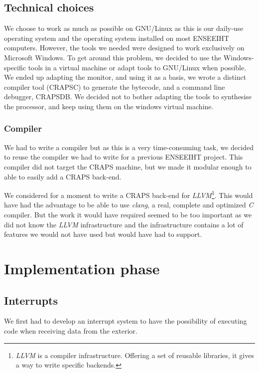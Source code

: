 \documentclass[openany, a4paper]{book}
\begin{document}
    \section{Technical choices}
      We choose to work as much as possible on GNU/Linux as this is our
      daily-use operating system and the operating system installed on most
      ENSEEIHT computers.
      However, the tools we needed were designed to work exclusively on
      Microsoft Windows. To get around this problem, we decided to use the
      Windows-specific tools in a virtual machine or adapt tools to GNU/Linux
      when possible. We ended up adapting the monitor, and using it as a basis,
      we wrote a distinct compiler tool (CRAPSC) to generate the bytecode, and
      a command line debugger, CRAPSDB. We decided not to bother adapting the
      tools to synthesise the processor, and keep using them on the windows
      virtual machine.

      \subsection{Compiler}
        We had to write a compiler but as this is a very time-consuming task, we
        decided to reuse the compiler we had to write for a previous ENSEEIHT
        project. This compiler did not target the CRAPS machine, but we made it
        modular enough to able to easily add a CRAPS back-end.

        We considered for a moment to write a CRAPS back-end for
        \emph{LLVM}\footnote{\textit{LLVM} is a compiler infrastructure.
        Offering a set of reusable libraries, it gives a way to write specific
        backends.\cite{llvm}}. This would have had the advantage to be able to
        use \emph{clang}, a real, complete and optimized \emph{C} compiler. But
        the work it would have required seemed to be too important as we did
        not know the \emph{LLVM} infrastructure and the infrastructure contains
        a lot of features we would not have used but would have had to
        support.

  \chapter{Implementation phase}
    \section{Interrupts}
      We first had to develop an interrupt system to have the possibility of
      executing code when receiving data from the exterior.
\end{document}
